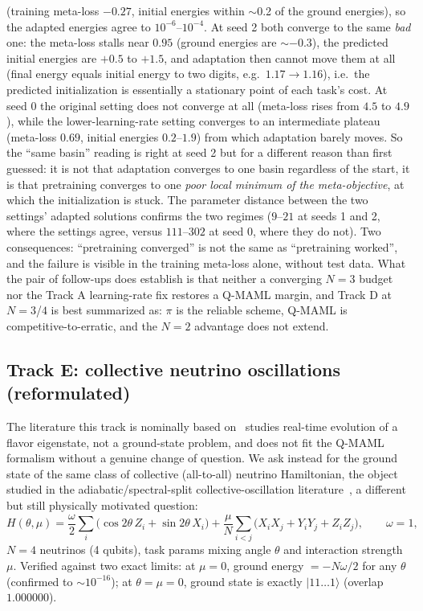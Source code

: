 \documentclass[11pt]{article}
\begin{document}
\begin{keyresult}
(training meta-loss $-0.27$, initial energies within $\sim$0.2 of the ground energies), so the adapted energies
agree to $10^{-6}$--$10^{-4}$. At seed 2 both converge to the same \emph{bad} one: the meta-loss stalls near
$0.95$ (ground energies are $\sim-0.3$), the predicted initial energies are $+0.5$ to $+1.5$, and adaptation
then cannot move them at all (final energy equals initial energy to two digits, e.g.\ $1.17\to1.16$), i.e.\ the
predicted initialization is essentially a stationary point of each task's cost. At seed 0 the original setting
does not converge at all (meta-loss rises from $4.5$ to $4.9$), while the lower-learning-rate setting
converges to an intermediate plateau (meta-loss $0.69$, initial energies $0.2$--$1.9$) from which adaptation
barely moves. So the ``same basin'' reading is right at seed 2 but for a different reason than first
guessed: it is not that adaptation converges to one basin regardless of the start, it is that pretraining
converges to one \emph{poor local minimum of the meta-objective}, at which the initialization is stuck. The
parameter distance between the two settings' adapted solutions confirms the two regimes ($9$--$21$ at
seeds 1 and 2, where the settings agree, versus $111$--$302$ at seed 0, where they do not). Two consequences: ``pretraining converged'' is not the same as
``pretraining worked'', and the failure is visible in the training meta-loss alone, without test data.
What the pair of follow-ups does establish is that neither a converging
$N{=}3$ budget nor the Track A learning-rate fix restores a Q-MAML margin, and Track D at $N{=}3$/$4$ is best
summarized as: $\pi$ is the reliable scheme, Q-MAML is competitive-to-erratic, and the $N{=}2$ advantage does
not extend.
\end{keyresult}

\FloatBarrier
\subsection{Track E: collective neutrino oscillations (reformulated)}
\label{sec:track-e}
The literature this track is nominally based on~\citep{neutrinoqc2021} studies real-time evolution of a
flavor eigenstate, not a ground-state problem, and does not fit the Q-MAML formalism without a genuine
change of question. We ask instead for the ground state of the same class of collective (all-to-all)
neutrino Hamiltonian, the object studied in the adiabatic/spectral-split collective-oscillation
literature~\citep{duanfullerqian2010}, a different but still physically motivated question:
\begin{equation}
H(\theta,\mu) = \frac{\omega}{2}\sum_i\big(\cos2\theta\, Z_i + \sin2\theta\, X_i\big)
+ \frac{\mu}{N}\sum_{i<j}\big(X_iX_j+Y_iY_j+Z_iZ_j\big), \qquad \omega=1,
\label{eq:neutrino}
\end{equation}
$N{=}4$ neutrinos (4 qubits), task params mixing angle $\theta$ and interaction strength $\mu$. Verified
against two exact limits: at $\mu{=}0$, ground energy $=-N\omega/2$ for any $\theta$ (confirmed to
$\sim10^{-16}$); at $\theta{=}\mu{=}0$, ground state is exactly $|11\dots1\rangle$ (overlap $1.000000$).
\end{document}
